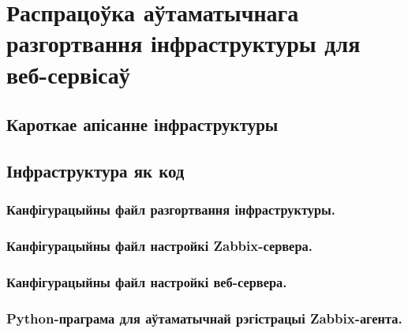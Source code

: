 \section{Распрацоўка аўтаматычнага разгортвання інфраструктуры для веб-сервісаў}

\subsection{Кароткае апісанне інфраструктуры}

\subsection{Інфраструктура як код}

\subsubsection{Канфігурацыйны файл разгортвання інфраструктуры.}

\subsubsection{Канфігурацыйны файл настройкі Zabbix-сервера.}

\subsubsection{Канфігурацыйны файл настройкі веб-сервера.}

\subsubsection{Python-праграма для аўтаматычнай рэгістрацыі Zabbix-агента.}
